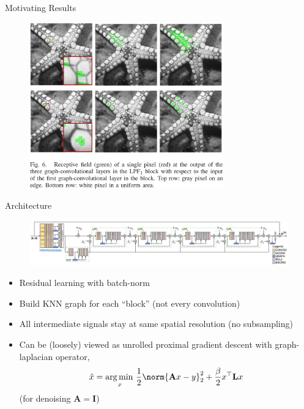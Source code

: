 \documentclass{beamer}
\DeclareMathOperator*{\argmin}{arg\,min\,} %
\begin{document}
\begin{frame}{Motivating Results \cite{ValsesiaICIP19}}
\begin{figure}[H]
\includegraphics[width=0.75\textwidth]{../imgs/starfish_cap.png}
\end{figure}
\end{frame}

\begin{frame}{Architecture \cite{ValsesiaICIP19}}
\begin{figure}[H]
\includegraphics[width=1\linewidth]{../imgs/gcdn_arch.png}
\end{figure}
\begin{itemize}
\item Residual learning with batch-norm
\item Build KNN graph for each ``block'' (not every convolution)
\item All intermediate signals stay at same spatial resolution (no subsampling)
\item Can be (loosely) viewed as unrolled proximal gradient descent with graph-laplacian operator,
$$ \hat{x} = \argmin_{x} \frac{1}{2}\norm{\mathbf{A}x-y}_2^2 + \frac{\beta}{2}x^\top \mathbf{L}x $$
(for denoising $\mathbf{A} = \mathbf{I}$)
\end{itemize}
\end{frame}
\end{document}
